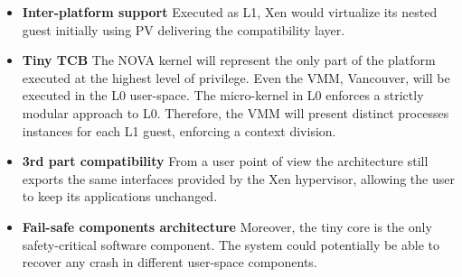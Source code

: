 \documentclass{sig-alternate}
\begin{document}
\begin{itemize}[]
\item \textbf{Inter-platform support} Executed as L1, Xen would virtualize its nested guest initially using PV delivering the compatibility layer.
\item \textbf{Tiny TCB} The NOVA kernel will represent the only part of the platform executed at the highest level of privilege. Even the VMM, Vancouver, will be executed in the L0 user-space. The micro-kernel in L0 enforces a strictly modular approach to L0. Therefore, the VMM will present distinct processes instances for each L1 guest, enforcing a context division.
\item \textbf{3rd part compatibility} From a user point of view the architecture still exports the same interfaces provided by the Xen hypervisor, allowing the user to keep its applications unchanged.
\item \textbf{Fail-safe components architecture} Moreover, the tiny core is the only safety-critical software component. The system could potentially be able to recover any crash in different user-space components.
\end{itemize}
\end{document}
